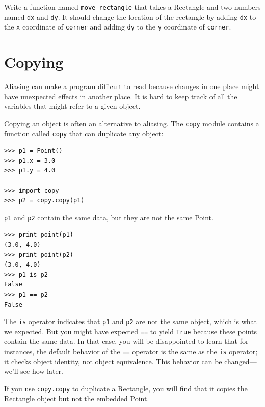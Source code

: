 \documentclass[10pt]{book}
\begin{document}
{\begin{ex}
Write a function named \verb"move_rectangle" that takes
a Rectangle and two numbers named {\tt dx} and {\tt dy}.  It
should change the location of the rectangle by adding {\tt dx}
to the {\tt x} coordinate of {\tt corner} and adding {\tt dy}
to the {\tt y} coordinate of {\tt corner}.
\end{ex}


\section{Copying}


Aliasing can make a program difficult to read because changes
in one place might have unexpected effects in another place.
It is hard to keep track of all the variables that might refer
to a given object.


Copying an object is often an alternative to aliasing.
The {\tt copy} module contains a function called {\tt copy} that
can duplicate any object:

\beforeverb
\begin{verbatim}
>>> p1 = Point()
>>> p1.x = 3.0
>>> p1.y = 4.0

>>> import copy
>>> p2 = copy.copy(p1)
\end{verbatim}
\afterverb
%
{\tt p1} and {\tt p2} contain the same data, but they are
not the same Point.

\beforeverb
\begin{verbatim}
>>> print_point(p1)
(3.0, 4.0)
>>> print_point(p2)
(3.0, 4.0)
>>> p1 is p2
False
>>> p1 == p2
False
\end{verbatim}
\afterverb
%
The {\tt is} operator indicates that {\tt p1} and {\tt p2} are not the
same object, which is what we expected.  But you might have expected
{\tt ==} to yield {\tt True} because these points contain the same
data.  In that case, you will be disappointed to learn that for
instances, the default behavior of the {\tt ==} operator is the same
as the {\tt is} operator; it checks object identity, not object
equivalence.  This behavior can be changed---we'll see how later.


If you use {\tt copy.copy} to duplicate a Rectangle, you will find
that it copies the Rectangle object but not the embedded Point.

}
\end{document}
